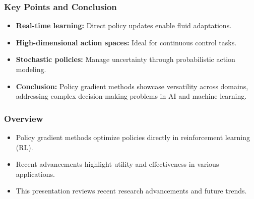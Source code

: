 \documentclass[aspectratio=169]{beamer}
\begin{document}
\begin{frame}[fragile]
  \frametitle{Key Points and Conclusion}
  \begin{itemize}
    \item \textbf{Real-time learning:} Direct policy updates enable fluid adaptations.
    \item \textbf{High-dimensional action spaces:} Ideal for continuous control tasks.
    \item \textbf{Stochastic policies:} Manage uncertainty through probabilistic action modeling.
    \item \textbf{Conclusion:} Policy gradient methods showcase versatility across domains, 
    addressing complex decision-making problems in AI and machine learning.
  \end{itemize}
\end{frame}

\begin{frame}[fragile]
  \frametitle{Overview}
  \begin{itemize}
    \item Policy gradient methods optimize policies directly in reinforcement learning (RL).
    \item Recent advancements highlight utility and effectiveness in various applications.
    \item This presentation reviews recent research advancements and future trends.
  \end{itemize}
\end{frame}
\end{document}

